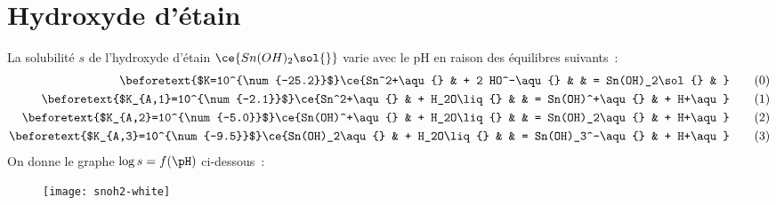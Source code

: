 \documentclass[a4paper, 10pt, final, garamond]{book}
\begin{document}

\resetQ
\section{Hydroxyde d'étain}
La solubilité $s$ de l'hydroxyde d'étain $\ce{Sn(OH)_2\sol{}}$ varie avec le pH
en raison des équilibres suivants~:
\begin{alignat}{3}
	\beforetext{$K=10^{\num{-25.2}}$}
	\ce{Sn^2+\aqu{}    & + 2 HO^-\aqu{} &  & = Sn(OH)_2\sol{}   & }
	\tag{0}\label{eq:R0}
	\\
	\beforetext{$K_{A,1}=10^{\num{-2.1}}$}
	\ce{Sn^2+\aqu{}    & + H_2O\liq{}   &  & = Sn(OH)^+\aqu{}   & + H+\aqu}
		\tag{1}\label{eq:R1}
	\\
		\beforetext{$K_{A,2}=10^{\num{-5.0}}$}
	\ce{Sn(OH)^+\aqu{} & + H_2O\liq{}   &  & = Sn(OH)_2\aqu{}   & + H+\aqu}
	\tag{2}\label{eq:R2}
	\\
	\beforetext{$K_{A,3}=10^{\num{-9.5}}$}
	\ce{Sn(OH)_2\aqu{} & + H_2O\liq{}   &  & = Sn(OH)_3^-\aqu{} & + H+\aqu}
	\tag{3}\label{eq:R3}
\end{alignat}
On donne le graphe $\log s = f(\pH)$ ci-dessous~:
\begin{figure}[htbp!]
	\centering
	\texttt{[image: snoh2-white]}
	\label{fig:snoh2}
\end{figure}
\end{document}
